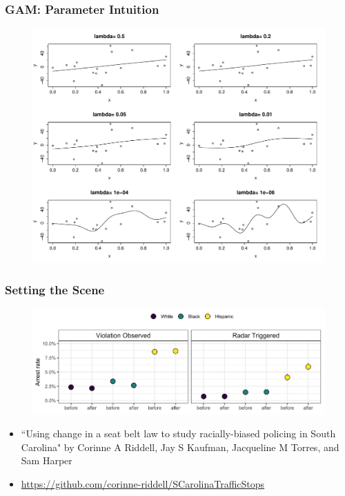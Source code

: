 \documentclass{beamer}
\begin{document}
\begin{frame}
\frametitle{GAM: Parameter Intuition}
\begin{figure}

\includegraphics[scale=.35]{figures/splineDiffLambda}
\end{figure}
\end{frame}




\begin{frame}
\frametitle{Setting the Scene}


\begin{figure}
\includegraphics[scale=.5]{figures/arrestRates}
\end{figure}


\begin{itemize}

\item ``Using change in a seat belt law to study racially-biased policing in South Carolina" by Corinne A Riddell, Jay S Kaufman, Jacqueline M Torres, and Sam Harper

\item \url{https://github.com/corinne-riddell/SCarolinaTrafficStops}

\end{itemize}

\end{frame}
\end{document}
